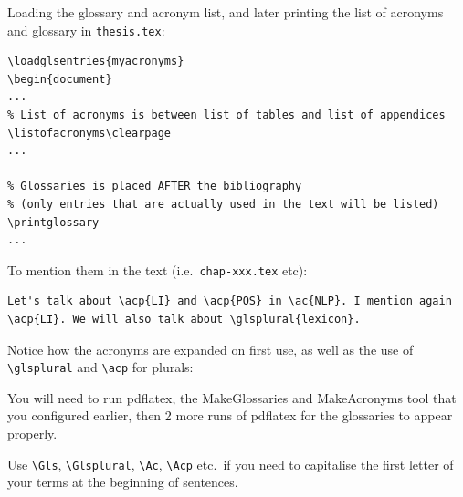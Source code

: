 \documentclass[a4paper,12pt]{scrartcl}
\begin{document}
\bigskip

Loading the glossary and acronym list, and later printing the list of acronyms and glossary in \texttt{thesis.tex}:

\medskip

\begin{lstlisting}[moretexcs={loadglsentries,printglossaries,listofacronyms}]
% Must be loaded BEFORE \begin{document}!
\loadglsentries{myacronyms}
\begin{document}
...
% List of acronyms is between list of tables and list of appendices
\listofacronyms\clearpage
...

% Glossaries is placed AFTER the bibliography
% (only entries that are actually used in the text will be listed)
\printglossary
...
\end{lstlisting}

\bigskip

To mention them in the text (i.e.~\texttt{chap-xxx.tex} etc):

\medskip

\begin{lstlisting}
Let's talk about \acp{LI} and \acp{POS} in \ac{NLP}. I mention again \acp{LI}. We will also talk about \glsplural{lexicon}.
\end{lstlisting}

\bigskip

Notice how the acronyms are expanded on first use, as well as the use of \lstinline|\glsplural| and \lstinline|\acp| for plurals:

\medskip

\fboxsep=12pt
\noindent{}

\bigskip

You will need to run \textsf{pdflatex}, the \textsf{MakeGlossaries} and \textsf{MakeAcronyms} tool that you configured earlier, then 2 more runs of \textsf{pdflatex} for the glossaries to appear properly.

Use \lstinline|\Gls|, \lstinline|\Glsplural|, \lstinline|\Ac|, \lstinline|\Acp| etc.~if you need to capitalise the first letter of your terms at the beginning of sentences.
\end{document}
